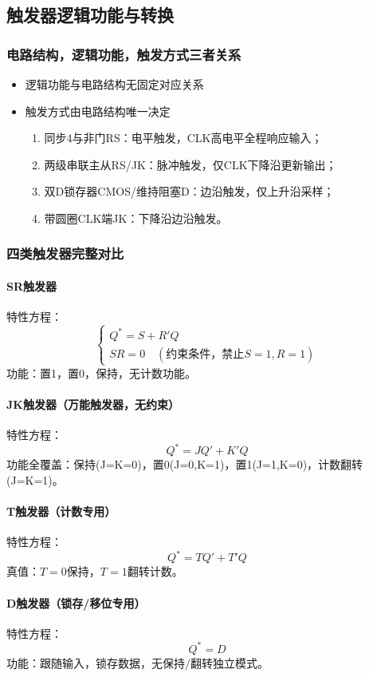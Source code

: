 \subsection{触发器逻辑功能与转换}
\subsubsection{电路结构，逻辑功能，触发方式三者关系}
\begin{itemize}
    \item 逻辑功能与电路结构无固定对应关系
    \item 触发方式由电路结构唯一决定
    \begin{enumerate}
        \item 同步4与非门RS：电平触发，CLK高电平全程响应输入；
        \item 两级串联主从RS/JK：脉冲触发，仅CLK下降沿更新输出；
        \item 双D锁存器CMOS/维持阻塞D：边沿触发，仅上升沿采样；
        \item 带圆圈CLK端JK：下降沿边沿触发。
    \end{enumerate}
\end{itemize}

\subsubsection{四类触发器完整对比}
\paragraph{SR触发器}
特性方程：
\[
\begin{cases}
Q^* = S + R'Q \\
SR = 0 \quad (\text{约束条件，禁止}S=1,R=1)
\end{cases}
\]
功能：置1，置0，保持，无计数功能。

\paragraph{JK触发器（万能触发器，无约束）}
特性方程：
\[
Q^* = JQ' + K'Q
\]
功能全覆盖：保持(J=K=0)，置0(J=0,K=1)，置1(J=1,K=0)，计数翻转(J=K=1)。

\paragraph{T触发器（计数专用）}
特性方程：
\[
Q^* = TQ' + T'Q
\]
真值：$T=0$保持，$T=1$翻转计数。

\paragraph{D触发器（锁存/移位专用）}
特性方程：
\[
Q^* = D
\]
功能：跟随输入，锁存数据，无保持/翻转独立模式。

